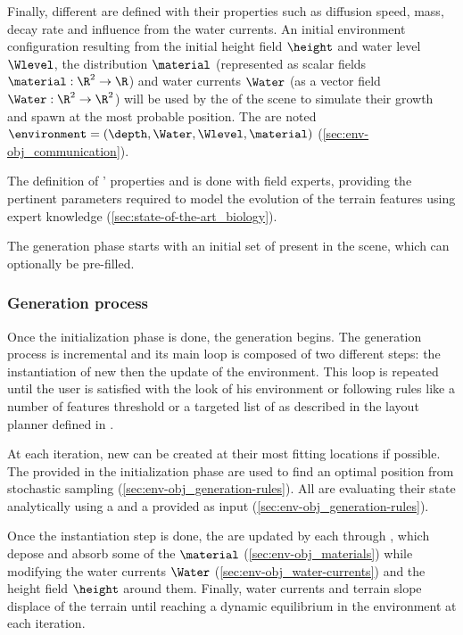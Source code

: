 Finally, different  are defined with their properties such as diffusion speed, mass, decay rate and influence from the water currents. An initial environment configuration resulting from the initial height field $\height$ and water level $\Wlevel$, the  distribution $\material$ (represented as scalar fields $\material: \R^2 \to \R$) and water currents $\Water$ (as a vector field $\Water: \R^2 \to \R^2$) will be used by the  of the scene to simulate their growth and spawn at the most probable position. The  are noted $\environment = (\depth, \Water, \Wlevel, \material)$ (\cref{sec:env-obj_communication}).

The definition of ' properties and  is done with field experts, providing the pertinent parameters required to model the evolution of the terrain features using expert knowledge (\cref{sec:state-of-the-art_biology}). 

The generation phase starts with an initial set of  present in the scene, which can optionally be pre-filled.

\subsubsection{Generation process} 

Once the initialization phase is done, the generation begins. The generation process is incremental and its main loop is composed of two different steps: the instantiation of new  then the update of the environment. This loop is repeated until the user is satisfied with the look of his environment or following rules like a number of features threshold or a targeted list of  as described in the layout planner defined in \citep{Tutenel2009}.


At each iteration, new  can be created at their most fitting locations if possible. The  provided in the initialization phase are used to find an optimal position from stochastic sampling (\cref{sec:env-obj_generation-rules}). 
All  are evaluating their state analytically using a  and a  provided as input (\cref{sec:env-obj_generation-rules}).

Once the instantiation step is done, the  are updated by each  through , which depose and absorb some of the  $\material$ (\cref{sec:env-obj_materials}) while modifying the water currents $\Water$ (\cref{sec:env-obj_water-currents}) and the height field $\height$ around them. Finally, water currents and terrain slope displace  of the terrain until reaching a dynamic equilibrium in the environment at each iteration.

